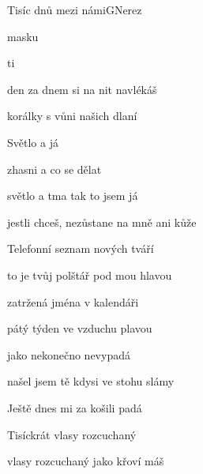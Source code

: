 \setcounter{page}{87}
\begin{song}{Tisíc dnů mezi námi}{G}{Nerez}

\begin{SBVerse}

  masku 

  ti 

den za dnem si na nit navlékáš

korálky s vůni našich dlaní

\end{SBVerse}

\begin{SBChorus*}

Světlo a   já

zhasni a co se dělat 

světlo a tma tak to jsem já

jestli chceš, nezůstane na mně ani kůže

\end{SBChorus*}

\begin{SBVerse}

Telefonní seznam nových tváří

to je tvůj polštář pod mou hlavou

zatržená jména v kalendáři

pátý týden ve vzduchu plavou

\end{SBVerse}

\begin{SBChorus*}

\end{SBChorus*}

\begin{SBChorus}

   

jako nekonečno nevypadá

našel jsem tě kdysi ve stohu slámy

Ještě dnes mi za košili padá

\end{SBChorus}

\begin{SBVerse}

Tisíckrát vlasy rozcuchaný

vlasy rozcuchaný jako křoví máš


\end{SBVerse}
\end{song}
